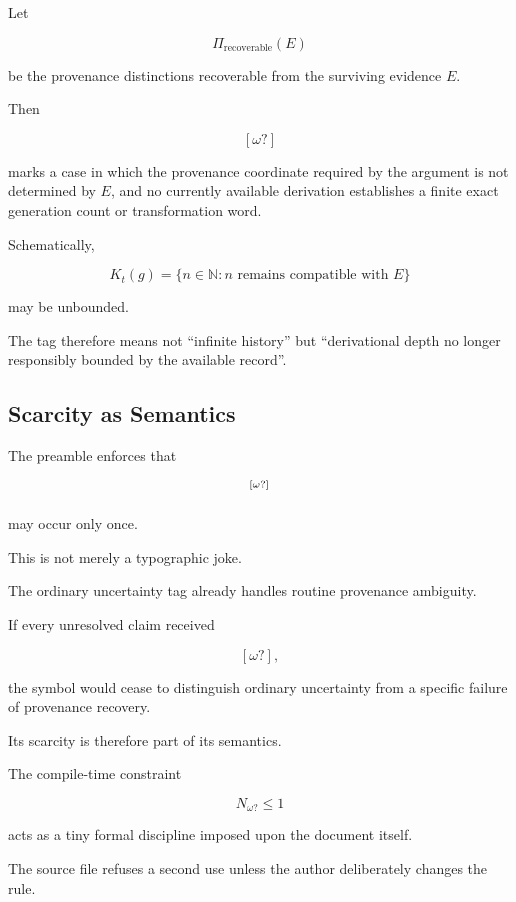\documentclass[
  11pt,
  a4paper,
  DIV=12,
  BCOR=0mm,
  parskip=half-
]{scrartcl}
\newcommand{\provomegadisplay}{\textsuperscript{$[\omega?]$}}
\theoremstyle{definition}
\theoremstyle{plain}
\theoremstyle{remark}
\begin{document}
Let

\[
  \Pi_{\mathrm{recoverable}}(E)
\]

be the provenance distinctions recoverable from the surviving evidence \(E\).

Then

\[
  [\omega?]
\]

marks a case in which the provenance coordinate required by the argument is
not determined by \(E\), and no currently available derivation establishes a
finite exact generation count or transformation word.

Schematically,

\[
  K_t(g)
  =
  \{
    n\in\mathbb N:
    n\text{ remains compatible with }E
  \}
\]

may be unbounded.

The tag therefore means not \enquote{infinite history} but
\enquote{derivational depth no longer responsibly bounded by the available
record}.


\subsection{Scarcity as Semantics}
\label{app:wound-scarcity}

The preamble enforces that

\[
  \provomegadisplay
\]

may occur only once.

This is not merely a typographic joke.

The ordinary uncertainty tag already handles routine provenance ambiguity.

If every unresolved claim received

\[
  [\omega?],
\]

the symbol would cease to distinguish ordinary uncertainty from a specific
failure of provenance recovery.

Its scarcity is therefore part of its semantics.

The compile-time constraint

\[
  N_{\omega?}\leq1
\]

acts as a tiny formal discipline imposed upon the document itself.

The source file refuses a second use unless the author deliberately changes
the rule.
\end{document}
